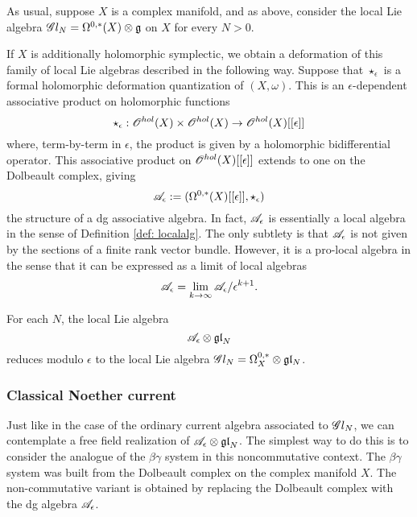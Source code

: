 As usual, suppose $X$ is a complex manifold, and as above, consider the local Lie algebra $\mathscr G l_N = \Omega^{0,*}(X) \otimes \mathfrak g$ on $X$ for every $N > 0$. 

If $X$ is additionally holomorphic symplectic, we obtain a deformation of this family of local Lie algebras described in the following way. 
Suppose that $\star_\epsilon$ is a formal holomorphic deformation quantization of $(X,\omega)$. 
This is an $\epsilon$-dependent associative product on holomorphic functions 
\[
\star_\epsilon : \mathscr O^{hol}(X) \times \mathscr O^{hol}(X) \to \mathscr O^{hol}(X)[[\epsilon]]
\]
where, term-by-term in $\epsilon$, the product is given by a holomorphic bidifferential operator. 
This associative product on $\mathscr O^{hol}(X)[[\epsilon]]$ extends to one on the Dolbeault complex, giving
\[
\mathscr A_\epsilon := (\Omega^{0,*}(X)[[\epsilon]], \star_{\epsilon})
\]
the structure of a dg associative algebra. 
In fact, $\mathscr A_\epsilon$ is essentially a local algebra in the sense of Definition \ref{def: localalg}. 
The only subtlety is that $\mathscr A_\epsilon$ is not given by the sections of a finite rank vector bundle.
However, it is a pro-local algebra in the sense that it can be expressed as a limit of local algebras
\[
\mathscr A_\epsilon = \lim_{k \to \infty} \mathscr A_\epsilon / \epsilon^{k+1} .
\] 

For each $N$, the local Lie algebra 
\[
\mathscr A_\epsilon \otimes {\mathfrak{gl}}_N
\]
reduces modulo $\epsilon$ to the local Lie algebra $\mathscr G l_N = \Omega^{0,*}_X \otimes \mathfrak{g} \mathfrak{l}_N$.

\subsubsection{Classical Noether current}

Just like in the case of the ordinary current algebra associated to $\mathscr G l_N$, we can contemplate a free field realization of $\mathscr A_\epsilon \otimes {\mathfrak{gl}}_N$.
The simplest way to do this is to consider the analogue of the $\beta\gamma$ system in this noncommutative context. 
The $\beta\gamma$ system was built from the Dolbeault complex on the complex manifold $X$. 
The non-commutative variant is obtained by replacing the Dolbeault complex with the dg algebra $\mathscr A_\epsilon$. 

